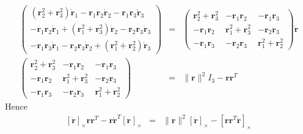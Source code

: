\documentclass {article}
\newcommand\rot{\mathbf{r}}
\newcommand\rcross[1]{[\rot_{#1}]_{\times}}
\newcommand\rdotcross{\left[\dot{\rot}\right]_{\times}}
\newcommand\normr{\|\rot\|}
\begin{document}
\begin{eqnarray*}
\left(\begin{array}{c}
(\rot_2^2+\rot_3^2)\dot{\rot}_1-\rot_1\rot_2\dot{\rot}_2-\rot_1\rot_3\dot{\rot}_3\\
-\rot_1\rot_2\dot{\rot}_1+(\rot_1^2+\rot_3^2)\dot{\rot}_2-\rot_2\rot_3\dot{\rot}_3\\
-\rot_1\rot_3\dot{\rot}_1-\rot_2\rot_3\dot{\rot}_2+(\rot_1^2+\rot_2^2)\dot{\rot}_3\end{array}\right) &=&
\left(\begin{array}{ccc}
\rot_2^2+\rot_3^2&-\rot_1\rot_2&-\rot_1\rot_3\\
-\rot_1\rot_2&\rot_1^2+\rot_3^2&-\rot_2\rot_3\\
-\rot_1\rot_3&-\rot_2\rot_3&\rot_1^2+\rot_2^2\end{array}\right) \dot{\rot}\\
\left(\begin{array}{ccc}
\rot_2^2+\rot_3^2&-\rot_1\rot_2&-\rot_1\rot_3\\
-\rot_1\rot_2&\rot_1^2+\rot_3^2&-\rot_2\rot_3\\
-\rot_1\rot_3&-\rot_2\rot_3&\rot_1^2+\rot_2^2\end{array}\right) &=& \normr^2 I_3 - \rot\rot^T
\end{eqnarray*}
Hence
\begin{eqnarray}\label{eq:ouf}
\rdotcross\rot\rot^T-\rot\dot{\rot}^T\rcross{}&=&
\normr^2\rdotcross - \left[\rot\rot^T\dot{\rot}\right]_{\times}
\end{eqnarray}
\end{document}
